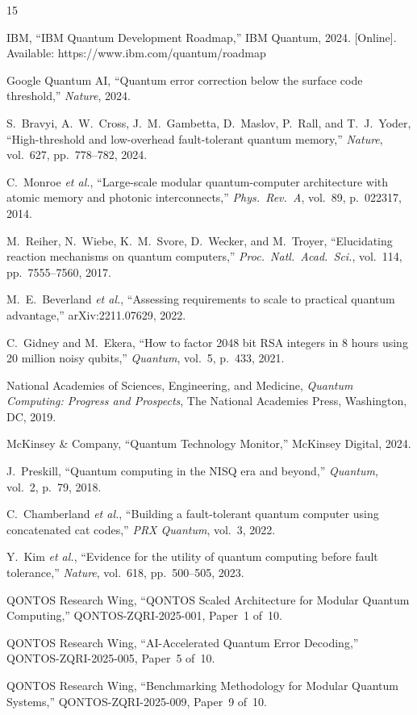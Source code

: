 \documentclass[conference]{IEEEtran}
\begin{document}
\begin{thebibliography}{15}

IBM, ``IBM Quantum Development Roadmap,'' IBM Quantum, 2024. [Online]. Available: https://www.ibm.com/quantum/roadmap

Google Quantum AI, ``Quantum error correction below the surface code threshold,'' \textit{Nature}, 2024.

S.~Bravyi, A.~W.~Cross, J.~M.~Gambetta, D.~Maslov, P.~Rall, and T.~J.~Yoder,
``High-threshold and low-overhead fault-tolerant quantum memory,''
\textit{Nature}, vol.~627, pp.~778--782, 2024.

C.~Monroe \textit{et al.},
``Large-scale modular quantum-computer architecture with atomic memory and photonic interconnects,''
\textit{Phys.\ Rev.\ A}, vol.~89, p.~022317, 2014.

M.~Reiher, N.~Wiebe, K.~M.~Svore, D.~Wecker, and M.~Troyer,
``Elucidating reaction mechanisms on quantum computers,''
\textit{Proc.\ Natl.\ Acad.\ Sci.}, vol.~114, pp.~7555--7560, 2017.

M.~E.~Beverland \textit{et al.},
``Assessing requirements to scale to practical quantum advantage,''
arXiv:2211.07629, 2022.

C.~Gidney and M.~Ekera,
``How to factor 2048 bit RSA integers in 8 hours using 20 million noisy qubits,''
\textit{Quantum}, vol.~5, p.~433, 2021.

National Academies of Sciences, Engineering, and Medicine,
\textit{Quantum Computing: Progress and Prospects},
The National Academies Press, Washington, DC, 2019.

McKinsey \& Company, ``Quantum Technology Monitor,'' McKinsey Digital, 2024.

J.~Preskill,
``Quantum computing in the NISQ era and beyond,''
\textit{Quantum}, vol.~2, p.~79, 2018.

C.~Chamberland \textit{et al.},
``Building a fault-tolerant quantum computer using concatenated cat codes,''
\textit{PRX Quantum}, vol.~3, 2022.

Y.~Kim \textit{et al.},
``Evidence for the utility of quantum computing before fault tolerance,''
\textit{Nature}, vol.~618, pp.~500--505, 2023.

QONTOS Research Wing,
``QONTOS Scaled Architecture for Modular Quantum Computing,''
QONTOS-ZQRI-2025-001, Paper~1 of~10.

QONTOS Research Wing,
``AI-Accelerated Quantum Error Decoding,''
QONTOS-ZQRI-2025-005, Paper~5 of~10.

QONTOS Research Wing,
``Benchmarking Methodology for Modular Quantum Systems,''
QONTOS-ZQRI-2025-009, Paper~9 of~10.

\end{thebibliography}
\end{document}
